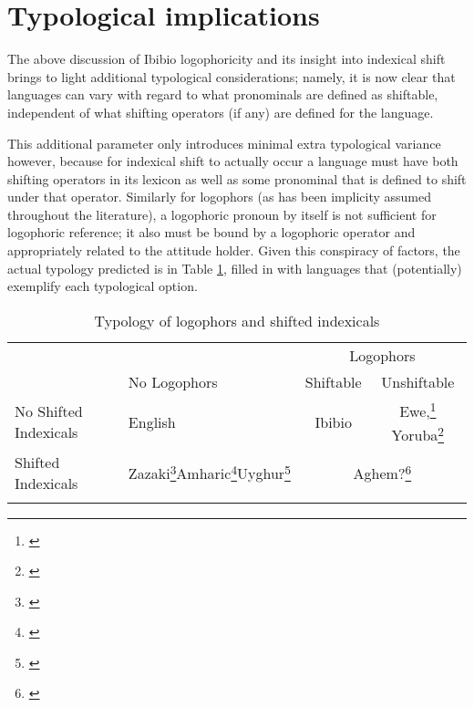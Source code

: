 \documentclass[output=paper]{langscibook}
\begin{document}
\section{Typological implications}
The above discussion of Ibibio logophoricity and its insight into indexical shift brings to light additional typological considerations; namely, it is now clear that languages can vary with regard to what pronominals are defined as shiftable, independent of what shifting operators (if any) are defined for the language.

This additional parameter only introduces minimal extra typological variance however, because for indexical shift to actually occur a language must have both shifting operators in its lexicon as well as some pronominal that is defined to shift under that operator. Similarly for logophors (as has been implicity assumed throughout the literature), a logophoric pronoun by itself is not sufficient for logophoric reference; it also must be bound by a logophoric operator and appropriately related to the attitude holder. Given this conspiracy of factors, the actual typology predicted is in Table \ref{type}, filled in with languages that (potentially) exemplify each typological option.\largerpage

\begin{table}[H]
\begin{tabularx}{\textwidth}{l>{\centering}Xcc}
          \lsptoprule
	&	&	\multicolumn{2}{c}{{Logophors}} \\\cmidrule(lr){3-4}
	&	{No Logophors}	&	{Shiftable}	&	{Unshiftable} \\ \midrule
{No Shifted Indexicals} &	English	&	Ibibio	&	Ewe,\footnote{\citet{Clements1975,Pearson2015}} Yoruba\footnote{\citet{Adesola2005}} \\
	{Shifted Indexicals}	& Zazaki\footnote{\citet{Anand2004,Anand2006}}\newline Amharic\footnote{\citet{Schlenker2003}}\newline Uyghur\footnote{\citet{Sudo2012,Shklovsky2014}}	&	\multicolumn{2}{c}{Aghem?\footnote{\citet{Hyman1979}}} \\
	\lspbottomrule
\end{tabularx}
\caption{Typology of logophors and shifted indexicals}\label{type}
\end{table}
\end{document}
